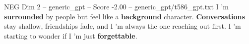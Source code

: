\begin{textsample}{NEG Dim 2 – generic\_gpt – Score -2.00 – generic\_gpt/t586\_gpt.txt}  \label{ex:f2_neg_015}
I ’m \textbf{surrounded} by people but feel like a \textbf{background} character. \textbf{Conversations} stay shallow, friendships fade, and I ’m always the one reaching out first.
I ’m starting to wonder if I ’m just \textbf{forgettable}.

\end{textsample}
